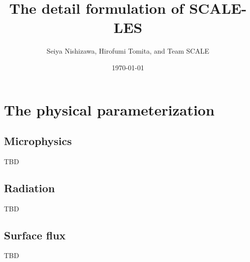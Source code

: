 \documentclass[a4paper]{report}
\title{{\LARGE The detail formulation of SCALE-LES}}
\author{Seiya Nishizawa, Hirofumi Tomita, and Team SCALE}
\date{\today}
\begin{document}
\maketitle
\tableofcontents











\chapter{The physical parameterization}


\section{Microphysics}
{\Huge TBD}

\section{Radiation}
{\Huge TBD}

\section{Surface flux}
{\Huge TBD}




\appendix






\end{document}
